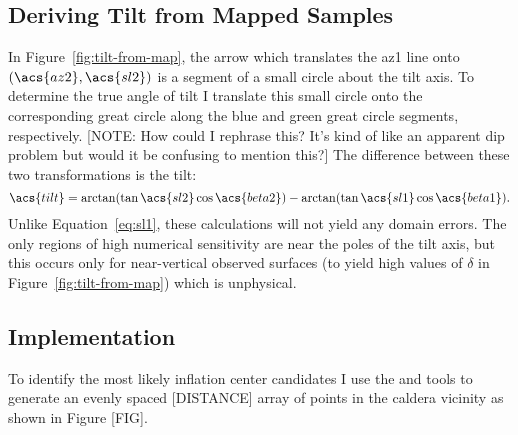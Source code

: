 \subsection{Deriving Tilt from Mapped Samples}
In Figure~\ref{fig:tilt-from-map}, the arrow which translates the \acs{az1} line onto $\left(\acs{az2},\acs{sl2}\right)$ is a segment of a small circle about the tilt axis. To determine the true angle of tilt I translate this small circle onto the corresponding great circle along the blue and green great circle segments, respectively. [NOTE: How could I rephrase this? It's kind of like an apparent dip problem but would it be confusing to mention this?] The difference between these two transformations is the tilt: 
\begin{equation}
    \acs{tilt} = \arctan(\tan\acs{sl2}\cos\acs{beta2}) - \arctan(\tan\acs{sl1}\cos\acs{beta1}).\label{eq:tilt-from-map}
\end{equation}
Unlike Equation~\eqref{eq:sl1}, these calculations will not yield any domain errors. The only regions of high numerical sensitivity are near the poles of the tilt axis, but this occurs only for near-vertical observed surfaces (to yield high values of $\delta$ in Figure~\ref{fig:tilt-from-map}) which is unphysical.

\subsection{Implementation}

To identify the most likely inflation center candidates I use the  and  tools to generate an evenly spaced [DISTANCE] array of points in the caldera vicinity as shown in Figure [FIG].

